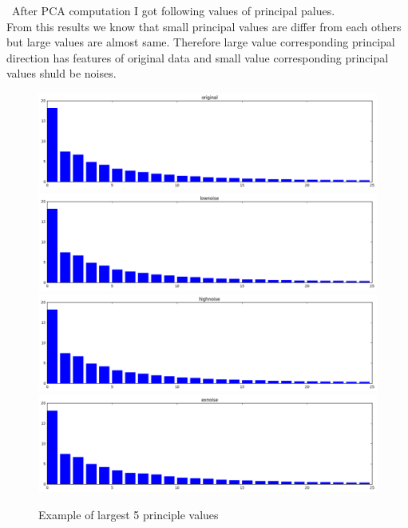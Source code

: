 \documentclass[a4paper,11pt]{article}
\begin{document}
\ After PCA computation I got following values of principal palues. \\
From this results we know that small principal values are differ from each others but large values are almost same. Therefore large value corresponding principal direction has features of original data and small value corresponding principal values shuld be noises.
\begin{figure}[htbp]
  \includegraphics[scale=0.4]{orgev.png}
  \includegraphics[scale=0.4]{lowev.png}
  \includegraphics[scale=0.4]{stev.png}
  \includegraphics[scale=0.4]{exev.png}
  \caption{Example of largest 5 principle values}
\end{figure}
\end{document}
